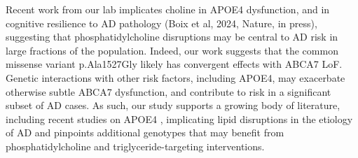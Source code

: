 Recent work from our lab implicates choline in APOE4 dysfunction\cite{Sienski2021-zt}, and in cognitive resilience to AD pathology (Boix et al, 2024, Nature, in press), suggesting that phosphatidylcholine disruptions may be central to AD risk in large fractions of the population. Indeed, our work suggests that the common missense variant p.Ala1527Gly likely has convergent effects with ABCA7 LoF. Genetic interactions with other risk factors, including APOE4, may exacerbate otherwise subtle ABCA7 dysfunction, and contribute to risk in a significant subset of AD cases\cite{Wang2021-oa,Hemani2013-zr,Haig2011-vs,Zuk2012-uz}. As such, our study supports a growing body of literature, including recent studies on APOE4 \cite{Haney2024-fx,Victor2022-tl}, implicating lipid disruptions in the etiology of AD and pinpoints additional genotypes that may benefit from phosphatidylcholine and triglyceride-targeting interventions. 
